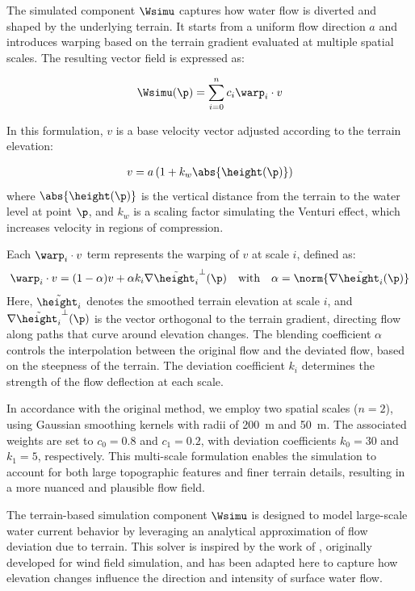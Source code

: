 The simulated component $\Wsimu$ captures how water flow is diverted and shaped by the underlying terrain. It starts from a uniform flow direction $a$ and introduces warping based on the terrain gradient evaluated at multiple spatial scales. The resulting vector field is expressed as:

\begin{align}
    \Wsimu(\p) = \sum_{i=0}^{n}{c_i \warp_i \cdot v}
\end{align}

In this formulation, $v$ is a base velocity vector adjusted according to the terrain elevation:

\begin{align}
    v = a \left(1 + k_w \abs{\height(\p)} \right)
\end{align}
where $\abs{\height(\p)}$ is the vertical distance from the terrain to the water level at point $\p$, and $k_w$ is a scaling factor simulating the Venturi effect, which increases velocity in regions of compression.

Each $\warp_i \cdot v$ term represents the warping of $v$ at scale $i$, defined as:
\begin{align}
    \warp_i \cdot v = (1 - \alpha) v + \alpha k_i \nabla \Tilde{\height_i}^{\perp}(\p) \quad \text{with} \quad \alpha = \norm{ \nabla \Tilde{\height_i}(\p) }
\end{align}
Here, $\Tilde{\height_i}$ denotes the smoothed terrain elevation at scale $i$, and $\nabla \Tilde{\height_i}^{\perp}(\p)$ is the vector orthogonal to the terrain gradient, directing flow along paths that curve around elevation changes. The blending coefficient $\alpha$ controls the interpolation between the original flow and the deviated flow, based on the steepness of the terrain. The deviation coefficient $k_i$ determines the strength of the flow deflection at each scale.

In accordance with the original method, we employ two spatial scales ($n = 2$), using Gaussian smoothing kernels with radii of 200~m and 50~m. The associated weights are set to $c_0 = 0.8$ and $c_1 = 0.2$, with deviation coefficients $k_0 = 30$ and $k_1 = 5$, respectively. This multi-scale formulation enables the simulation to account for both large topographic features and finer terrain details, resulting in a more nuanced and plausible flow field.

The terrain-based simulation component $\Wsimu$ is designed to model large-scale water current behavior by leveraging an analytical approximation of flow deviation due to terrain. This solver is inspired by the work of \cite{Paris2019b}, originally developed for wind field simulation, and has been adapted here to capture how elevation changes influence the direction and intensity of surface water flow.

